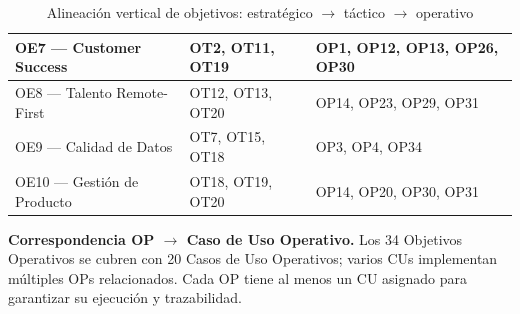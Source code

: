 ﻿\documentclass[11pt, letterpaper]{article}
\begin{document}
\begin{table}[H]
\begin{tabularx}{\linewidth}{>{\raggedright\arraybackslash}p{3.5cm} >{\raggedright\arraybackslash}p{3.5cm} >{\raggedright\arraybackslash}X}
\midrule

OE7 --- Customer Success & OT2, OT11, OT19 & OP1, OP12, OP13, OP26, OP30 \\

\midrule

OE8 --- Talento Remote-First & OT12, OT13, OT20 & OP14, OP23, OP29, OP31 \\

\midrule

OE9 --- Calidad de Datos & OT7, OT15, OT18 & OP3, OP4, OP34 \\

\midrule

OE10 --- Gestión de Producto & OT18, OT19, OT20 & OP14, OP20, OP30, OP31 \\

\bottomrule

\end{tabularx}

\caption{Alineación vertical de objetivos: estratégico $\rightarrow$ táctico $\rightarrow$ operativo}

\end{table}



\medskip

\textbf{Correspondencia OP $\rightarrow$ Caso de Uso Operativo.} Los 34 Objetivos Operativos se cubren con 20 Casos de Uso Operativos; varios CUs implementan múltiples OPs relacionados. Cada OP tiene al menos un CU asignado para garantizar su ejecución y trazabilidad.



\small

\setlength{\LTleft}{0pt}

\setlength{\LTright}{0pt}
\end{document}
